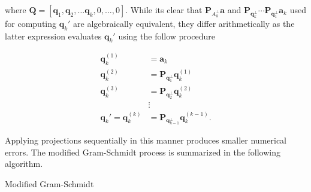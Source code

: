 where $\bm{Q} = \left[ \bm{q}_1 , \bm{q}_2 , \ldots \bm{q}_k, 0 , \ldots , 0 \right]$. While its clear that $\bm{P}_{A_{k}^{\perp}} \bm{a} $ and $\bm{P}_{\bm{q}_{k}^{\perp}} \cdots \bm{P}_{\bm{q}_{1}^{\perp}} \bm{a}_k$ used for computing $\bm{q}_k'$ are algebraically equivalent, they differ arithmetically as the latter expression evaluates $\bm{q}_k'$ using the follow procedure

\begin{align*}
    \bm{q}_k^{(1)}             & = \bm{a}_k                                        \\
    \bm{q}_k^{(2)}             & = \bm{P}_{\bm{q}_{1}^{\perp}} \bm{q}_k^{(1)}      \\
    \bm{q}_k^{(3)}             & = \bm{P}_{\bm{q}_{2}^{\perp}} \bm{q}_k^{(2)}      \\
                               & \vdots                                            \\
    \bm{q}_k' = \bm{q}_k^{(k)} & = \bm{P}_{\bm{q}_{k-1}^{\perp}} \bm{q}_k^{(k-1)}.
\end{align*}

Applying projections sequentially in this manner produces smaller numerical errors. The modified Gram-Schmidt process \cite{TrefethenLloydN.LloydNicholas1997Nla/,DemmelJamesW1997Anla} is summarized in the following algorithm.

    {\centering
        \begin{minipage}{.85\linewidth}
            \begin{algorithm}[H]
                \caption{Modified Gram-Schmidt}
                \label{alg: Modified_Gram-Schmidt}
                \SetAlgoLined
                \DontPrintSemicolon

                \BlankLine
                \BlankLine
            \end{algorithm}
        \end{minipage}
        \par
    }